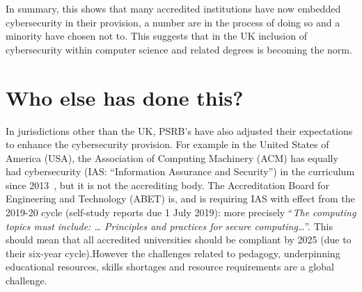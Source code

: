 \documentclass[sigconf]{acmart}
\begin{document}
In summary, this shows that many accredited institutions have now embedded cybersecurity in their provision, a number are in the process of doing so and a minority have chosen not to. This suggests that in the UK inclusion of cybersecurity within computer science and related degrees is becoming the norm. 

\section {Who else has done this?}	
In jurisdictions other than the UK, PSRB's have also adjusted their expectations to enhance the cybersecurity provision. For example in the United States of America (USA), the Association of Computing Machinery (ACM) has equally had cybersecurity (IAS: ``Information Assurance and Security'') in the curriculum since 2013~\cite{ACM2013a}, but it is not the accrediting body. The Accreditation Board for Engineering and Technology (ABET) is, and is requiring IAS with effect from the 2019-20 cycle (self-study reports due 1 July 2019): more precisely \cite[Table 3]{Oudshoornetal2018a} ``{\emph{The computing topics must include: \dots{} Principles and practices for secure computing\dots}}''. This should mean that  all accredited universities should be compliant by 2025 (due to their six-year cycle).However the challenges related to pedagogy, underpinning educational resources, skills shortages and resource requirements are a global challenge.

\begin{comment}


Within the computer science education research community there is a growing appreciate for the need to enhance underpinning resources for example \cite{Drop2019}. Also educational cybersecurity is an increasing common theme at education research conferences.


\end{comment}
\end{document}
